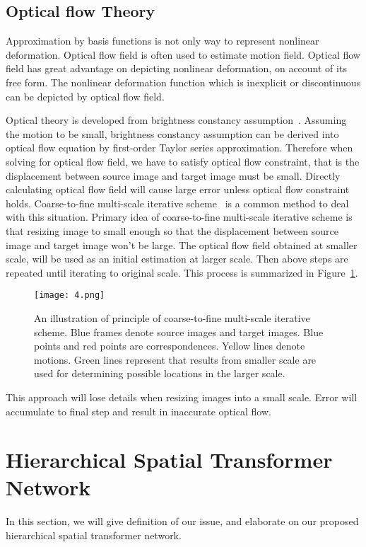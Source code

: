 \documentclass{article}
\begin{document}
\subsection{Optical flow Theory}
Approximation by basis functions is not only way to represent nonlinear deformation.
Optical flow field is often used to estimate motion field.
Optical flow field has great advantage on depicting nonlinear deformation, on account of its free form.
The nonlinear deformation function which is inexplicit or discontinuous can be depicted by optical flow field.

Optical theory is developed from brightness constancy assumption~\cite{Lucas1981An,horn1981determining}.
Assuming the motion to be small, brightness constancy assumption can be derived into optical flow equation by first-order Taylor series approximation.
Therefore when solving for optical flow field, we have to satisfy optical flow constraint, that is the displacement between source image and target image must be small.
Directly calculating optical flow field will cause large error unless optical flow constraint holds.
Coarse-to-fine multi-scale iterative scheme~\cite{opticflow,siftflow} is a common method to deal with this situation.
Primary idea of coarse-to-fine multi-scale iterative scheme is that resizing image to small enough so that the displacement between source image and target image won't be large.
The optical flow field obtained at smaller scale, will be used as an initial estimation at larger scale.
Then above steps are repeated until iterating to original scale.
This process is summarized in Figure~\ref{fig:4}.
\begin{figure}[t]
    \centering
    \texttt{[image: 4.png]}
    \caption{\label{fig:4}An illustration of principle of coarse-to-fine multi-scale iterative scheme. Blue frames denote source images and target images. Blue points and red points are correspondences. Yellow lines denote motions. Green lines represent that results from smaller scale are used for determining possible locations in the larger scale.}
\end{figure}

This approach will lose details when resizing images into a small scale.
Error will accumulate to final step and result in inaccurate optical flow.
\section{Hierarchical Spatial Transformer Network}
In this section, we will give definition of our issue, and elaborate on our proposed hierarchical spatial transformer network.
\end{document}
